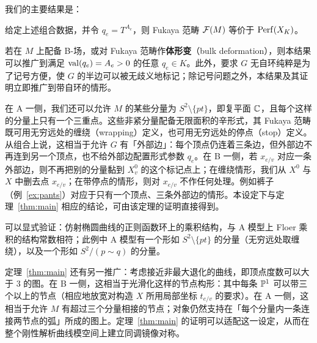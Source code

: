 我们的主要结果是：

\begin{theo}\label{thm:main}
给定上述组合数据，并令 $q_e=T^{A_e}$，则 Fukaya 范畴 $\mathcal{F}(M)$ 等价于 $\operatorname{Perf}(X_K)$。
\end{theo}

\begin{remark}\label{rmk:main}
若在 $M$ 上配备 B-场，或对 Fukaya 范畴作\textbf{体形变}（bulk deformation），则本结果可以推广到满足 $\operatorname{val}(q_e)=A_e>0$ 的任意 $q_e\in K$。此外，要求 $G$ 无自环纯粹是为了记号方便，使 $G$ 的半边可以被无歧义地标记；除记号问题之外，本结果及其证明立即推广到带自环的情形。
\end{remark}

\begin{remark}\label{rmk:opencase}
在 A 一侧，我们还可以允许 $M$ 的某些分量为 $S^2\setminus\{pt\}$，即复平面 $\mathbb{C}$，且每个这样的分量上只有一个三重点。这些非紧分量配备无限面积的辛形式，其 Fukaya 范畴既可用无穷远处的缠绕（wrapping）定义，也可用无穷远处的停点（stop）定义。从组合上说，这相当于允许 $G$ 有「外部边」：每个顶点仍连着三条边，但外部边不再连到另一个顶点，也不给外部边配置形式参数 $q_e$。在 B 一侧，若 $x_{e/v}$ 对应一条外部边，则不再把别的分量黏到 $X^0_v$ 的这个标记点上；在缠绕情形，我们从 $X^0$ 与 $X$ 中删去点 $x_{e/v}$；在带停点的情形，则对 $x_{e/v}$ 不作任何处理。例如裤子（例~\ref{ex:pants}）对应于只有一个顶点、三条外部边的情形。本设定下与定理~\ref{thm:main} 相应的结论，可由该定理的证明直接得到。
\end{remark}

\begin{remark}
可以显式验证：仿射椭圆曲线的正则函数环上的乘积结构，与 A 模型上 Floer 乘积的结构常数相符；此例中 A 模型有一个形如 $S^2\setminus\{pt\}$ 的分量（无穷远处取缠绕），以及一个形如 $S^2/(p\sim q)$ 的分量。
\end{remark}

定理~\ref{thm:main} 还有另一推广：考虑接近非最大退化的曲线，即顶点度数可以大于 $3$ 的图。在 B 一侧，这相当于光滑化这样的节点构形：其中每条 $\mathbb{P}^1$ 可以带三个以上的节点（相应地放宽对构造 $X$ 所用局部坐标 $t_{e/v}$ 的要求）。在 A 一侧，这相当于允许 $M$ 有超过三个分量相接的节点；对象仍然支持在「每个分量内一条连接两节点的弧」所成的图上。定理~\ref{thm:main} 的证明可以适配这一设定，从而在整个刚性解析曲线模空间上建立同调镜像对称。

